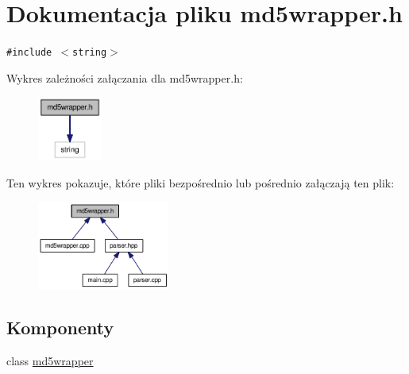 \hypertarget{a00013}{
\section{Dokumentacja pliku md5wrapper.h}
\label{d7/dd4/a00013}
}
{\tt \#include $<$string$>$}\par


Wykres zależności załączania dla md5wrapper.h:\nopagebreak
\begin{figure}[H]
\begin{center}
\leavevmode
\includegraphics[width=60pt]{d6/d97/a00045}
\end{center}
\end{figure}


Ten wykres pokazuje, które pliki bezpośrednio lub pośrednio załączają ten plik:\nopagebreak
\begin{figure}[H]
\begin{center}
\leavevmode
\includegraphics[width=123pt]{d3/dea/a00046}
\end{center}
\end{figure}
\subsection*{Komponenty}
\begin{CompactItemize}
\item 
class \hyperlink{a00004}{md5wrapper}
\end{CompactItemize}
